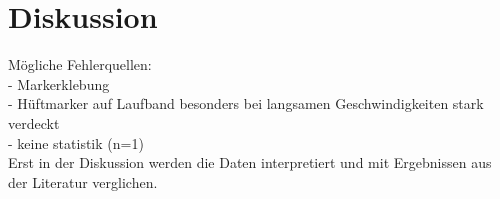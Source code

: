 \section{Diskussion}
Mögliche Fehlerquellen:\\
- Markerklebung\\
- Hüftmarker auf Laufband besonders bei langsamen Geschwindigkeiten stark verdeckt\\
- keine statistik (n=1)\\

Erst in der Diskussion werden die Daten interpretiert und mit Ergebnissen aus der Literatur verglichen.